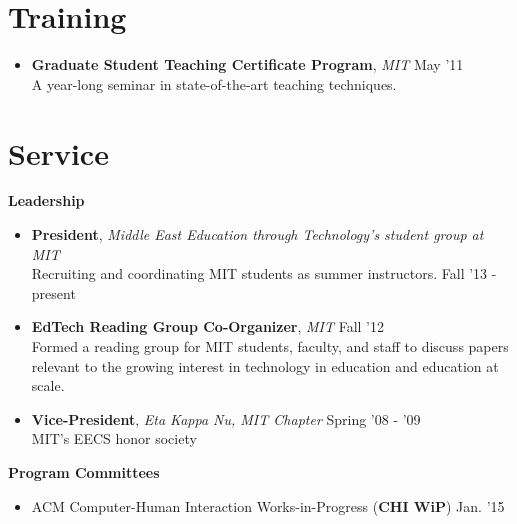\documentclass[margin]{res}
\begin{document}
\begin{resume}
\section{Training}
\begin{itemize}[leftmargin=*]
\item {\bf Graduate Student Teaching Certificate Program}, {\it MIT} \hfill May '11 \\ A year-long seminar in state-of-the-art teaching techniques.
\end{itemize}

\section{Service}
{\bf Leadership}
                \begin{itemize}[leftmargin=*] %
                \item {\bf President}, {\it Middle East Education through Technology's student group at MIT} \\ Recruiting and coordinating MIT students as summer instructors. \hfill Fall '13 - present %
		\item {\bf EdTech Reading Group Co-Organizer}, {\it MIT} \hfill Fall '12 \\ Formed a reading group for MIT students, faculty, and staff to discuss papers relevant to the growing interest in technology in education and education at scale.
                \item {\bf Vice-President}, {\it Eta Kappa Nu, MIT Chapter} \hfill Spring '08 - '09 \\ MIT's EECS honor society 
\end{itemize}

{\bf Program Committees}
 \begin{itemize}[leftmargin=*]
\item ACM Computer-Human Interaction Works-in-Progress ({\bf CHI WiP}) \hfill Jan. '15
\end{itemize}


\end{resume}
\end{document}

